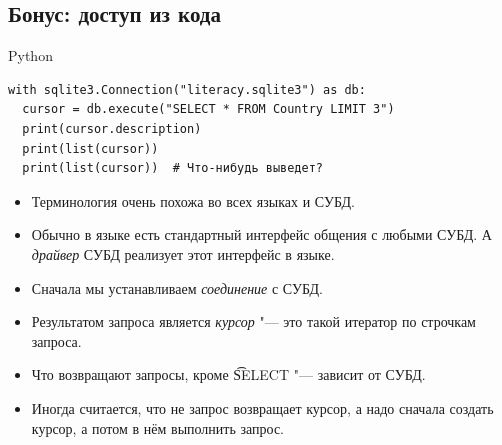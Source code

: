 \subsection{Бонус: доступ из кода}

\begin{frame}[fragile]{Python}
\begin{verbatim}
with sqlite3.Connection("literacy.sqlite3") as db:
  cursor = db.execute("SELECT * FROM Country LIMIT 3")
  print(cursor.description)
  print(list(cursor))
  print(list(cursor))  # Что-нибудь выведет?
\end{verbatim}
	\begin{itemize}
		\item Терминология очень похожа во всех языках и СУБД.
		\item Обычно в языке есть стандартный интерфейс общения с любыми СУБД.
			А \textit{драйвер} СУБД реализует этот интерфейс в языке.
		\item Сначала мы устанавливаем \textit{соединение} с СУБД.
		\item Результатом запроса является \textit{курсор} "--- это такой итератор по строчкам запроса.
		\item Что возвращают запросы, кроме \t{SELECT} "--- зависит от СУБД.
		\item
			Иногда считается, что не запрос возвращает курсор, а надо
			сначала создать курсор, а потом в нём выполнить запрос.
	\end{itemize}
\end{frame}

